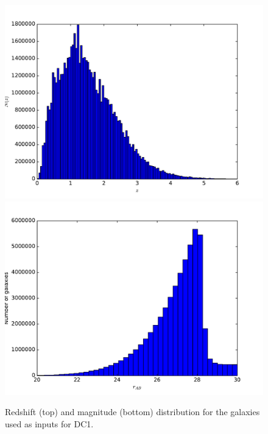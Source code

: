 \documentclass[\docopts]{\docclass}
\begin{document}
\begin{figure}
\centering
\includegraphics[width=0.9\columnwidth]{n_z_galaxies.pdf}
\includegraphics[width=0.9\columnwidth]{n_m_galaxies.pdf}
\caption{Redshift (top) and magnitude (bottom) distribution for the galaxies used as inputs for DC1.}
\label{fig:catalog_plots}
\end{figure}
\end{document}
